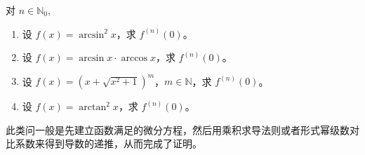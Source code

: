 \documentclass[../../main.tex]{subfiles}%
\begin{document}
\begin{example}[生成级数或者建立递推法求解高阶导数值]
对 \( n \in \mathbb{N}_0 \),
\begin{enumerate}[(1)]
\item 设 \( f(x) = \arcsin^2 x \)，求 \( f^{(n)}(0) \)。

\item 设 \( f(x) = \arcsin x \cdot \arccos x \)，求 \( f^{(n)}(0) \)。

\item 设 \( f(x) = (x + \sqrt{x^2 + 1})^m \)，\( m \in \mathbb{N} \)，求 \( f^{(n)}(0) \)。

\item 设 \( f(x) = \arctan^2 x \)，求 \( f^{(n)}(0) \)。
\end{enumerate}
\end{example}
\begin{note}
此类问一般是先建立函数满足的微分方程，然后用乘积求导法则或者形式幂级数对比系数来得到导数的递推，从而完成了证明。
\end{note}
\end{document}
